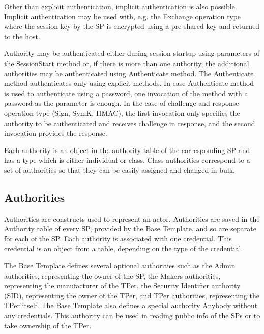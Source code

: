 Other than explicit authentication, implicit authentication is also possible. Implicit authentication may be used with, e.g. the Exchange operation type where the session key by the SP is encrypted using a pre-shared key and returned to the host.

Authority may be authenticated either during session startup using parameters of the SessionStart method or, if there is more than one authority, the additional authorities may be authenticated using Authenticate method. 
The Authenticate method authenticates only using explicit methods. 
In case Authenticate method is used to authenticate using a password, one invocation of the method with a password as the parameter is enough. In the case of challenge and response operation type (Sign, SymK, HMAC), the first invocation only specifies the authority to be authenticated and receives challenge in response, and the second invocation provides the response.

Each authority is an object in the authority table of the corresponding SP and has a type which is either individual or class. Class authorities correspond to a set of authorities so that they can be easily assigned and changed in bulk.



\subsection{Authorities}
\label{subsection:authorities}

Authorities are constructs used to represent an actor. Authorities are saved in the Authority table of every SP, provided by the Base Template, and so are separate for each of the SP. Each authority is associated with one credential. This credential is an object from a table, depending on the type of the credential.

The Base Template defines several optional authorities such as the Admin authorities, representing the owner of the SP, the Makers authorities, representing the manufacturer of the TPer, the Security Identifier authority (SID), representing the owner of the TPer, and TPer authorities, representing the TPer itself.
The Base Template also defines a special authority Anybody without any credentials. This authority can be used in reading public info of the SPs or to take ownership of the TPer.

